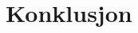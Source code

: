 \documentclass[DIV=calc, paper=a4, fontsize=12pt]{scrartcl}	 %
\begin{document}

\section{Konklusjon}

\begin{multicols}{2}

\end{multicols}





\end{document}
